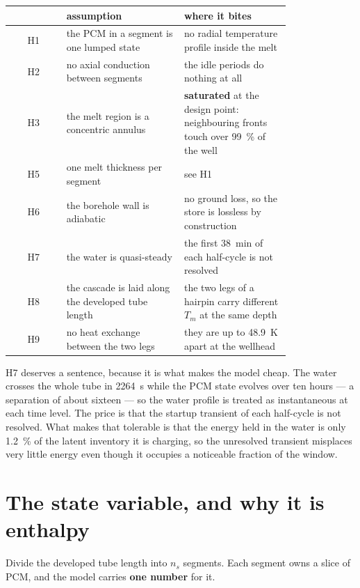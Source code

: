 \documentclass[11pt,a4paper]{article}
\newcommand{\Tm}{\ensuremath{T_{m}}}
\begin{document}
\begin{center}
\begin{tabular}{@{}c p{0.42\linewidth} p{0.38\linewidth}@{}}
\toprule
 & assumption & where it bites \\
\midrule
H1 & the PCM in a segment is one lumped state & no radial temperature profile
     inside the melt \\
H2 & no axial conduction between segments & the idle periods do nothing at all \\
H3 & the melt region is a concentric annulus & \textbf{saturated} at the design
     point: neighbouring fronts touch over \SI{99}{\percent} of the well \\
H5 & one melt thickness per segment & see H1 \\
H6 & the borehole wall is adiabatic & no ground loss, so the store is lossless
     by construction \\
H7 & the water is quasi-steady & the first \SI{38}{\minute} of each half-cycle
     is not resolved \\
H8 & the cascade is laid along the developed tube length & the two legs of a
     hairpin carry different $\Tm$ at the same depth \\
H9 & no heat exchange between the two legs & they are up to
     \SI{48.9}{\kelvin} apart at the wellhead \\
\bottomrule
\end{tabular}
\end{center}

H7 deserves a sentence, because it is what makes the model cheap. The water
crosses the whole tube in \SI{2264}{\second} while the PCM state evolves over
ten hours --- a separation of about sixteen --- so the water profile is treated
as instantaneous at each time level. The price is that the startup transient of
each half-cycle is not resolved. What makes that tolerable is that the energy
held in the water is only \SI{1.2}{\percent} of the latent inventory it is
charging, so the unresolved transient misplaces very little energy even though
it occupies a noticeable fraction of the window.

\section{The state variable, and why it is enthalpy}
\label{sec:state}

Divide the developed tube length into $n_s$ segments. Each segment owns a slice
of PCM, and the model carries \textbf{one number} for it.
\end{document}
